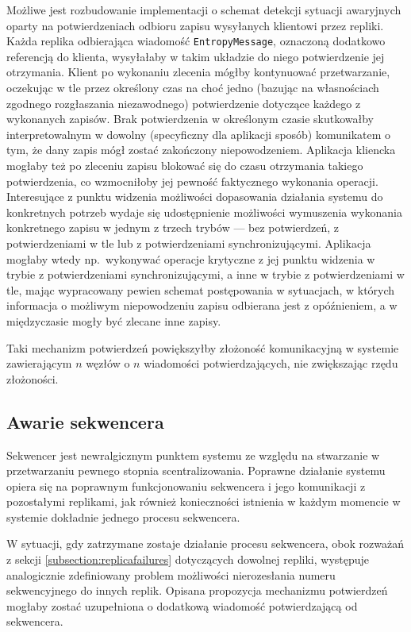 Możliwe jest rozbudowanie implementacji o schemat detekcji sytuacji awaryjnych oparty na
potwierdzeniach odbioru zapisu wysyłanych klientowi przez repliki. Każda replika odbierająca
wiadomość \texttt{EntropyMessage}, oznaczoną dodatkowo referencją do klienta, wysyłałaby w takim
układzie do niego potwierdzenie jej otrzymania. Klient po wykonaniu zlecenia mógłby kontynuować
przetwarzanie, oczekując w tle przez określony czas na choć jedno (bazując na własnościach zgodnego
rozgłaszania niezawodnego) potwierdzenie dotyczące każdego z wykonanych zapisów. Brak potwierdzenia
w określonym czasie skutkowałby interpretowalnym w dowolny (specyficzny dla aplikacji sposób)
komunikatem o tym, że dany zapis mógł zostać zakończony niepowodzeniem. Aplikacja kliencka mogłaby
też po zleceniu zapisu blokować się do czasu otrzymania takiego potwierdzenia, co wzmocniłoby jej
pewność faktycznego wykonania operacji. Interesujące z punktu widzenia możliwości dopasowania
działania systemu do konkretnych potrzeb wydaje się udostępnienie możliwości wymuszenia wykonania
konkretnego zapisu w jednym z trzech trybów --- bez potwierdzeń, z potwierdzeniami w tle lub z
potwierdzeniami synchronizującymi. Aplikacja mogłaby wtedy np.\ wykonywać operacje krytyczne z jej punktu widzenia w trybie z potwierdzeniami synchronizującymi, a inne w trybie z potwierdzeniami w tle, mając wypracowany pewien schemat postępowania w sytuacjach, w których informacja o możliwym niepowodzeniu zapisu odbierana jest z opóźnieniem, a w międzyczasie mogły być zlecane inne zapisy.

Taki mechanizm potwierdzeń powiększyłby złożoność komunikacyjną w systemie zawierającym $n$ węzłów o $n$ wiadomości potwierdzających, nie zwiększając rzędu złożoności.

\subsection{Awarie sekwencera} \label{subsection:sequencerfailures}

Sekwencer jest newralgicznym punktem systemu ze względu na stwarzanie w przetwarzaniu pewnego stopnia scentralizowania. Poprawne działanie systemu opiera się na poprawnym funkcjonowaniu sekwencera i jego komunikacji z pozostałymi replikami, jak również konieczności istnienia w każdym momencie w systemie dokładnie jednego procesu sekwencera.

W sytuacji, gdy zatrzymane zostaje działanie procesu sekwencera, obok rozważań z sekcji \ref{subsection:replicafailures} dotyczących dowolnej repliki, występuje analogicznie zdefiniowany problem możliwości nierozesłania numeru sekwencyjnego do innych replik. Opisana propozycja mechanizmu potwierdzeń mogłaby zostać uzupełniona o dodatkową wiadomość potwierdzającą od sekwencera.

